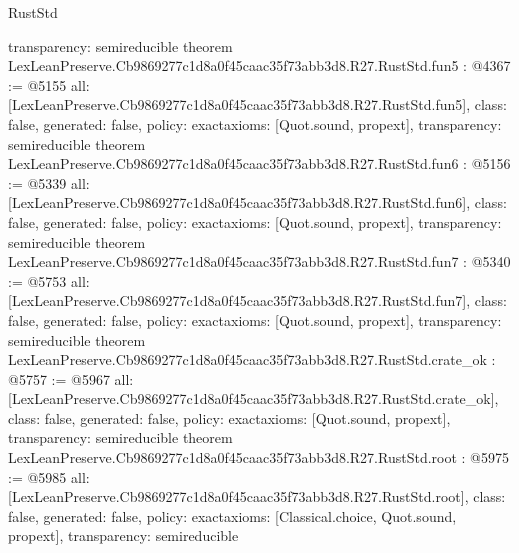 \begin{lexlean}{RustStd}
\begin{coremodule}
{  transparency: semireducible
}
theorem LexLeanPreserve.Cb9869277c1d8a0f45caac35f73abb3d8.R27.RustStd.fun5 : @4367 := @5155 {
  all: [LexLeanPreserve.Cb9869277c1d8a0f45caac35f73abb3d8.R27.RustStd.fun5],
  class: false,
  generated: false,
  policy: exact{axioms: [Quot.sound, propext]},
  transparency: semireducible
}
theorem LexLeanPreserve.Cb9869277c1d8a0f45caac35f73abb3d8.R27.RustStd.fun6 : @5156 := @5339 {
  all: [LexLeanPreserve.Cb9869277c1d8a0f45caac35f73abb3d8.R27.RustStd.fun6],
  class: false,
  generated: false,
  policy: exact{axioms: [Quot.sound, propext]},
  transparency: semireducible
}
theorem LexLeanPreserve.Cb9869277c1d8a0f45caac35f73abb3d8.R27.RustStd.fun7 : @5340 := @5753 {
  all: [LexLeanPreserve.Cb9869277c1d8a0f45caac35f73abb3d8.R27.RustStd.fun7],
  class: false,
  generated: false,
  policy: exact{axioms: [Quot.sound, propext]},
  transparency: semireducible
}
theorem LexLeanPreserve.Cb9869277c1d8a0f45caac35f73abb3d8.R27.RustStd.crate_ok : @5757 := @5967 {
  all: [LexLeanPreserve.Cb9869277c1d8a0f45caac35f73abb3d8.R27.RustStd.crate_ok],
  class: false,
  generated: false,
  policy: exact{axioms: [Quot.sound, propext]},
  transparency: semireducible
}
theorem LexLeanPreserve.Cb9869277c1d8a0f45caac35f73abb3d8.R27.RustStd.root : @5975 := @5985 {
  all: [LexLeanPreserve.Cb9869277c1d8a0f45caac35f73abb3d8.R27.RustStd.root],
  class: false,
  generated: false,
  policy: exact{axioms: [Classical.choice, Quot.sound, propext]},
  transparency: semireducible
}


\end{coremodule}
\end{lexlean}
